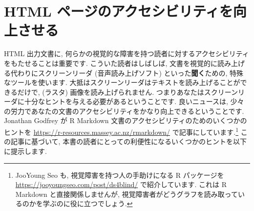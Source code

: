 \documentclass[
  11pt,
]{bxjsreport}
\begin{document}
\hypertarget{html-accessibility}{%
\section{HTML ページのアクセシビリティを向上させる}\label{html-accessibility}}

HTML 出力文書に, 何らかの視覚的な障害を持つ読者に対するアクセシビリティをもたせることは重要です. こういた読者はしばしば, 文書を視覚的に読み上げる代わりにスクリーンリーダ (音声読み上げソフト) といった\textbf{聞く}ための, 特殊なツールを使います. 大抵はスクリーンリーダはテキストを読み上げることができるだけで, (ラスタ) 画像を読み上げられません. つまりあなたはスクリーンリーダに十分なヒントを与える必要があるということです. 良いニュースは, 少々の労力であなたの文書のアクセシビリティをかなり向上できるということです. Jonathan Godfrey が R Markdown 文書のアクセシビリティのためのいくつかのヒントを \url{https://r-resources.massey.ac.nz/rmarkdown/} で記事にしています.\footnote{JooYoung Seo も, 視覚障害を持つ人の手助けになる R パッケージを \url{https://jooyoungseo.com/post/ds4blind/} で紹介しています. これは R Markdown と直接関係しませんが, 視覚障害者がどうグラフを読み取っているのかを学ぶのに役に立つでしょう.} この記事に基づいて, 本書の読者にとっての利便性になるいくつかのヒントを以下に提示します.
\end{document}
